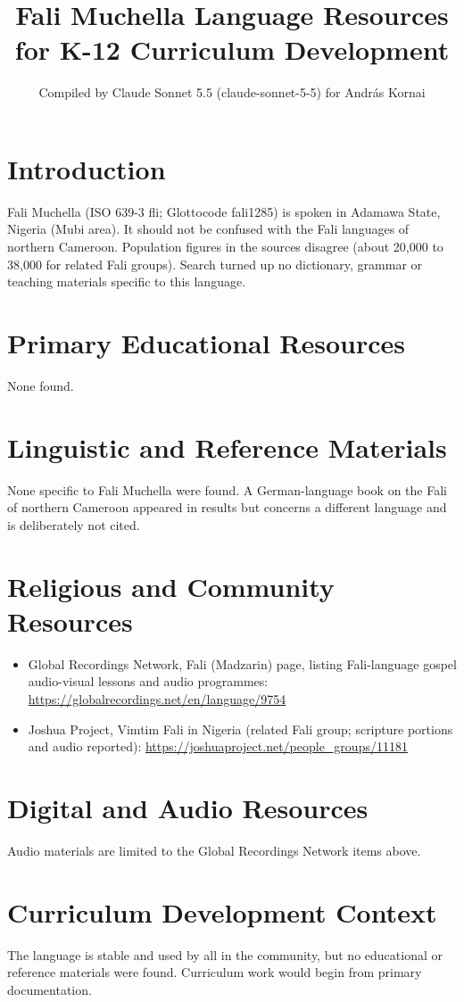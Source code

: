 \documentclass[12pt]{article}
\title{Fali Muchella Language Resources for K-12 Curriculum Development}
\author{Compiled by Claude Sonnet 5.5 (claude-sonnet-5-5) for Andr\'as Kornai}
\date{}
\begin{document}
\maketitle

\section{Introduction}
Fali Muchella (ISO 639-3 fli; Glottocode fali1285) is spoken in Adamawa State, Nigeria (Mubi area). It should not be confused with the Fali languages of northern Cameroon. Population figures in the sources disagree (about 20,000 to 38,000 for related Fali groups). Search turned up no dictionary, grammar or teaching materials specific to this language.

\section{Primary Educational Resources}
None found.

\section{Linguistic and Reference Materials}
None specific to Fali Muchella were found. A German-language book on the Fali of northern Cameroon appeared in results but concerns a different language and is deliberately not cited.

\section{Religious and Community Resources}
\begin{itemize}
\item Global Recordings Network, Fali (Madzarin) page, listing Fali-language gospel audio-visual lessons and audio programmes: \url{https://globalrecordings.net/en/language/9754}
\item Joshua Project, Vimtim Fali in Nigeria (related Fali group; scripture portions and audio reported): \url{https://joshuaproject.net/people_groups/11181}
\end{itemize}

\section{Digital and Audio Resources}
Audio materials are limited to the Global Recordings Network items above.

\section{Curriculum Development Context}
The language is stable and used by all in the community, but no educational or reference materials were found. Curriculum work would begin from primary documentation.
\end{document}
